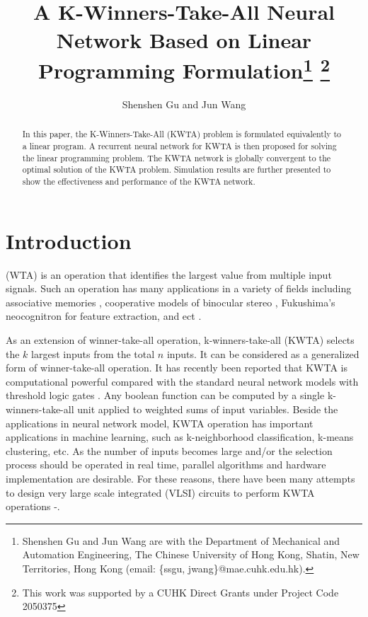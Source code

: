 \documentclass[conference]{IEEEtran}
\begin{document}
\title{\ \\ \LARGE\bf A K-Winners-Take-All Neural Network Based on Linear Programming Formulation\thanks{Shenshen Gu and Jun Wang are with the Department of Mechanical and Automation Engineering, The Chinese University of Hong Kong, Shatin, New Territories, Hong Kong (email: \{ssgu, jwang\}@mae.cuhk.edu.hk).} \thanks{This work was supported by a CUHK Direct Grants under Project Code
2050375}}

\author{Shenshen Gu and Jun Wang}


\maketitle

\begin{abstract}
In this paper, the K-Winners-Take-All (KWTA) problem is formulated
equivalently to a linear program. A recurrent neural network for
KWTA is then proposed for solving the linear programming problem.
The KWTA network is globally convergent to the optimal solution of
the KWTA problem. Simulation results are further presented to show
the effectiveness and performance of the KWTA network.
\end{abstract}


\section{Introduction}


 (WTA) is an operation that identifies
the largest value from multiple input signals. Such an operation has
many applications in a variety of fields including associative
memories \cite{cit:1}, cooperative models of binocular stereo
\cite{cit:2}, Fukushima's neocognitron for feature extraction, and
ect \cite{cit:3}.

As an extension of winner-take-all operation, k-winners-take-all
(KWTA) selects the $k$ largest inputs from the total $n$ inputs. It
can be considered as a generalized form of winner-take-all
operation. It has recently been reported that KWTA is computational
powerful compared with the standard neural network models with
threshold logic gates \cite{cit:4}\cite{cit:5}. Any boolean function
can be computed by a single k-winners-take-all unit applied to
weighted sums of input variables. Beside the applications in neural
network model, KWTA operation has important applications in machine
learning, such as k-neighborhood classification, k-means clustering,
etc. As the number of inputs becomes large and/or the selection
process should be operated in real time, parallel algorithms and
hardware implementation are desirable. For these reasons, there have
been many attempts to design very large scale integrated (VLSI)
circuits to perform KWTA operations \cite{cit:6}-\cite{cit:29}.
\end{document}
